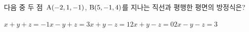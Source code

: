 다음 중 두 점~$\mathrm{A}(-2{,}\mkern3mu\mathopen{}1{,}\mkern3mu\mathopen{}-1)$, $\mathrm{B}(5{,}\mkern3mu\mathopen{}-1{,}\mkern3mu\mathopen{}4)$를 지나는 직선과 평행한 평면의 방정식은?
\begin{choicesii}{$x+y+z=-1$}{$x-y+z=3$}{$x+y-z=1$}{$2x+y-z=0$}{$2x-y-z=3$}\end{choicesii}

